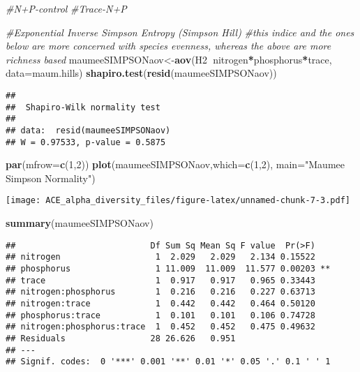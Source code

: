 \documentclass[]{article}
\newenvironment{Shaded}{\begin{snugshade}}{\end{snugshade}}
\newcommand{\KeywordTok}[1]{\textcolor[rgb]{0.13,0.29,0.53}{\textbf{#1}}}
\newcommand{\DataTypeTok}[1]{\textcolor[rgb]{0.13,0.29,0.53}{#1}}
\newcommand{\DecValTok}[1]{\textcolor[rgb]{0.00,0.00,0.81}{#1}}
\newcommand{\StringTok}[1]{\textcolor[rgb]{0.31,0.60,0.02}{#1}}
\newcommand{\CommentTok}[1]{\textcolor[rgb]{0.56,0.35,0.01}{\textit{#1}}}
\newcommand{\OperatorTok}[1]{\textcolor[rgb]{0.81,0.36,0.00}{\textbf{#1}}}
\newcommand{\NormalTok}[1]{#1}
\begin{document}
\begin{Shaded}
\begin{Highlighting}[]
\CommentTok{#N+P-control}
\CommentTok{#Trace-N+P}

\CommentTok{#Exponential Inverse Simpson Entropy (Simpson Hill)}
\CommentTok{#this indice and the ones below are more concerned with species evenness, whereas the above are more richness based}
\NormalTok{maumeeSIMPSONaov<-}\KeywordTok{aov}\NormalTok{(H2}\OperatorTok{~}\NormalTok{nitrogen}\OperatorTok{*}\NormalTok{phosphorus}\OperatorTok{*}\NormalTok{trace, }\DataTypeTok{data=}\NormalTok{maum.hills)}
\KeywordTok{shapiro.test}\NormalTok{(}\KeywordTok{resid}\NormalTok{(maumeeSIMPSONaov))}
\end{Highlighting}
\end{Shaded}

\begin{verbatim}
## 
##  Shapiro-Wilk normality test
## 
## data:  resid(maumeeSIMPSONaov)
## W = 0.97533, p-value = 0.5875
\end{verbatim}

\begin{Shaded}
\begin{Highlighting}[]
\KeywordTok{par}\NormalTok{(}\DataTypeTok{mfrow=}\KeywordTok{c}\NormalTok{(}\DecValTok{1}\NormalTok{,}\DecValTok{2}\NormalTok{))}
\KeywordTok{plot}\NormalTok{(maumeeSIMPSONaov,}\DataTypeTok{which=}\KeywordTok{c}\NormalTok{(}\DecValTok{1}\NormalTok{,}\DecValTok{2}\NormalTok{), }\DataTypeTok{main=}\StringTok{"Maumee Simpson Normality"}\NormalTok{)}
\end{Highlighting}
\end{Shaded}

\texttt{[image: ACE\_alpha\_diversity\_files/figure-latex/unnamed-chunk-7-3.pdf]}

\begin{Shaded}
\begin{Highlighting}[]
\KeywordTok{summary}\NormalTok{(maumeeSIMPSONaov)}
\end{Highlighting}
\end{Shaded}

\begin{verbatim}
##                           Df Sum Sq Mean Sq F value  Pr(>F)   
## nitrogen                   1  2.029   2.029   2.134 0.15522   
## phosphorus                 1 11.009  11.009  11.577 0.00203 **
## trace                      1  0.917   0.917   0.965 0.33443   
## nitrogen:phosphorus        1  0.216   0.216   0.227 0.63713   
## nitrogen:trace             1  0.442   0.442   0.464 0.50120   
## phosphorus:trace           1  0.101   0.101   0.106 0.74728   
## nitrogen:phosphorus:trace  1  0.452   0.452   0.475 0.49632   
## Residuals                 28 26.626   0.951                   
## ---
## Signif. codes:  0 '***' 0.001 '**' 0.01 '*' 0.05 '.' 0.1 ' ' 1
\end{verbatim}
\end{document}

